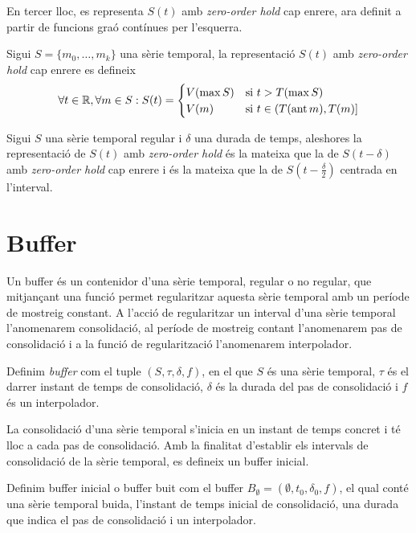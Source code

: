 En tercer lloc, es representa $S(t)$ amb \emph{zero-order hold} cap enrere, ara definit a partir de funcions graó contínues per l'esquerra.
\begin{definition}
  Sigui $S=\{m_0,\ldots,m_k\}$ una sèrie temporal, la representació
  $S(t)$ amb \emph{zero-order hold} cap enrere es defineix
\[
\forall t \in \mathbb{R}  ,\forall m \in S:
S(t) =  
\begin{cases}
  V(\max S) & \text{si } t > T(\max S) \\
  V(m) & \text{si }  t\in (T(\operatorname*{ant} m),T(m)]
\end{cases}
\]
\end{definition}

Sigui $S$ una sèrie temporal regular i $\delta$ una durada de temps, aleshores la representació de $S(t)$ amb \emph{zero-order hold} és la mateixa que la de $S(t-\delta)$ amb \emph{zero-order hold} cap enrere i és la mateixa que la de $S(t-\frac{\delta}{2})$ centrada en l'interval. 




\section{Buffer}\label{sec:model:buffer}

Un buffer és un contenidor d'una sèrie temporal, regular o no regular, que mitjançant una funció permet regularitzar aquesta sèrie temporal amb un període de mostreig constant. A l'acció de regularitzar un interval d'una sèrie temporal l'anomenarem consolidació, al període de mostreig contant l'anomenarem pas de consolidació i a la funció de regularització l'anomenarem interpolador.

\begin{definition}[Buffer]
  Definim \emph{buffer} com el tuple $(S,\tau,\delta,f)$, en el que
  $S$ és una sèrie temporal, $\tau$ és el darrer instant de temps de
  consolidació, $\delta$ és la durada del pas de consolidació i $f$ és
  un interpolador.
\end{definition}

La consolidació d'una sèrie temporal s'inicia en un instant de temps concret i té lloc a cada pas de consolidació. Amb la finalitat d'establir els intervals de consolidació de la sèrie temporal, es defineix un buffer inicial.

\begin{definition}\label{def:buffer_buit}
  Definim buffer inicial o buffer buit com el buffer $B_{\emptyset} =
  (\emptyset,t_0, \delta_0, f)$, el qual
  conté una sèrie temporal buida, l'instant de temps inicial de
  consolidació, una durada que indica el pas de consolidació i un
  interpolador.
\end{definition}


